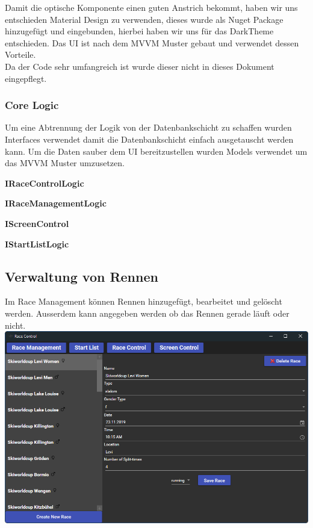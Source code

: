 \documentclass[a4paper, 12pt]{article}
\begin{document}
	Damit die optische Komponente einen guten Anstrich bekommt, haben wir uns entschieden Material Design zu verwenden, dieses wurde als Nuget Package hinzugefügt und eingebunden, hierbei haben wir uns für das DarkTheme entschieden. Das UI ist nach dem MVVM Muster gebaut und verwendet dessen Vorteile.\\
	Da der Code sehr umfangreich ist wurde dieser nicht in dieses Dokument eingepflegt.
	
	\newpage
	\subsubsection{Core Logic}
	Um eine Abtrennung der Logik von der Datenbankschicht zu schaffen wurden Interfaces verwendet damit die Datenbankschicht einfach ausgetauscht werden kann. Um die Daten sauber dem UI bereitzustellen wurden Models verwendet um das MVVM Muster umzusetzen.
	\newline
	
	\textbf{IRaceControlLogic}
	
	\textbf{IRaceManagementLogic}
	
	\textbf{IScreenControl}
	
	\textbf{IStartListLogic}
	
	
	\subsection{Verwaltung von Rennen}
	Im Race Management können Rennen hinzugefügt, bearbeitet und gelöscht werden. Ausserdem kann angegeben werden ob das Rennen gerade läuft oder nicht.
	\newline
	\includegraphics[width=.7\textwidth]{img/ui_raceManagement.png}
	\newline
	
\end{document}
